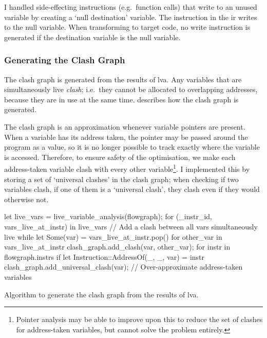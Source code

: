 \documentclass[00-main.tex]{subfiles}
\begin{document}
I handled side-effecting instructions (e.g.~function calls) that write to an unused variable by creating a `null destination' variable.
The instruction in the \gls{ir} writes to the null variable.
When transforming to target code, no write instruction is generated if the destination variable is the null variable.


\subsubsection{Generating the Clash Graph}\label{sec:impl:generating clash graph}

The clash graph is generated from the results of \gls{lva}.
Any variables that are simultaneously live \emph{clash}; i.e.\ they cannot be allocated to overlapping addresses, because they are in use at the same time.
 describes how the clash graph is generated.

The clash graph is an approximation whenever variable pointers are present.
When a variable has its address taken, the pointer may be passed around the program as a value, so it is no longer possible to track exactly where the variable is accessed.
Therefore, to ensure safety of the optimisation, we make each address-taken variable clash with every other variable\footnote{Pointer analysis may be able to improve upon this to reduce the set of clashes for address-taken variables, but cannot solve the problem entirely.}.
I implemented this by storing a set of `universal clashes' in the clash graph; when checking if two variables clash, if one of them is a `universal clash', they clash even if they would otherwise not.

\begin{listing}[t]
  \begin{RustListing}
    let live_vars = live_variable_analysis(flowgraph);
    for (_instr_id, vars_live_at_instr) in live_vars {
        // Add a clash between all vars simultaneously live
        while let Some(var) = vars_live_at_instr.pop() {
            for other_var in vars_live_at_instr {
                clash_graph.add_clash(var, other_var);
            }
        }
    }
    for instr in flowgraph.instrs {
        if let Instruction::AddressOf(_, _, var) = instr {
            clash_graph.add_universal_clash(var); // Over-approximate address-taken variables
        }
    }
  \end{RustListing}
  \caption{Algorithm to generate the clash graph from the results of \acrlong{lva}.}
  \label{lst:clash graph generation}
\end{listing}
\end{document}
